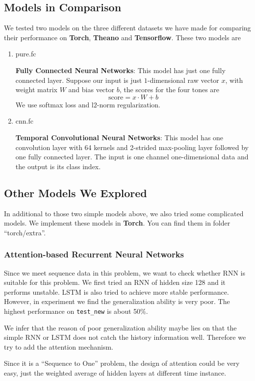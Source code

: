 \documentclass[a4paper]{article}
\begin{document}
\subsection{Models in Comparison}
We tested two models on the three different datasets we have made for comparing their performance on {\bf Torch}, {\bf Theano} and {\bf Tensorflow}. These two models are
\begin{enumerate}
\item pure.fc

	{\bf Fully Connected Neural Networks}: This model has just one fully connected layer. Suppose our input is just $1$-dimensional raw vector $x$, with weight matrix $W$ and bias vector $b$, the scores for the four tones are
	\[
		\text{score} = x \cdot W + b
	\]
	We use softmax loss and l$2$-norm regularization.

\item cnn.fc

	{\bf Temporal Convolutional Neural Networks}: This model has one convolution layer with 64 kernels and 2-strided max-pooling layer followed by one fully connected layer. The input is one channel one-dimensional data and the output is its class index.

\end{enumerate}

\subsection{Other Models We Explored}
In additional to those two simple models above, we also tried some complicated models. We implement these models in {\bf Torch}. You can find them in folder ``torch/extra''.
\subsubsection{Attention-based Recurrent Neural Networks}
Since we meet sequence data in this problem, we want to check whether RNN is suitable for this problem. We first tried an RNN of  hidden size 128 and it performs unstable. LSTM is also tried to achieve more stable performance. However, in experiment we find the generalization ability is very poor. The highest performance on \texttt{test\_new} is about 50\%.

We infer that the reason of poor generalization ability maybe lies on that the simple RNN or LSTM does not catch the history information well. Therefore we try to add the attention mechanism.

Since it is a ``Sequence to One'' problem, the design of attention could be very easy, just the weighted average of hidden layers at different time instance. 
\end{document}
